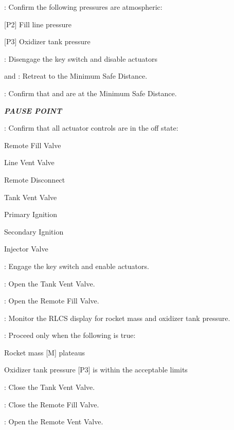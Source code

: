 \begin{checklist}
    \item \control{}: Confirm the following pressures are atmospheric:
    \begin{checklist}
        \item {[P2]} Fill line pressure
        \item {[P3]} Oxidizer tank pressure
    \end{checklist}
    \item \control{}: Disengage the key switch and disable actuators
    \item \primary{} and \secondary{}: Retreat to the Minimum Safe Distance.
    \item \secondary{}: Confirm that \primary{} and \secondary{} are at the Minimum Safe Distance.
    \item \textbf{\textit{PAUSE POINT}}
    \item \control: Confirm that all actuator controls are in the off state:
    \begin{checklist}
        \item Remote Fill Valve
        \item Line Vent Valve
        \item Remote Disconnect
        \item Tank Vent Valve
        \item Primary Ignition
        \item Secondary Ignition
        \item Injector Valve
    \end{checklist}
    \item \control{}: Engage the key switch and enable actuators.
    \item \control{}: Open the Tank Vent Valve.
    \item \control{}: Open the Remote Fill Valve.
    \item \control{}: Monitor the RLCS display for rocket mass and oxidizer tank pressure.
    \item \ops{}: Proceed only when the following is true:
    \begin{checklist}
        \item Rocket mass [M] plateaus
        \item Oxidizer tank pressure [P3] is within the acceptable limits
    \end{checklist}
    \item \control{}: Close the Tank Vent Valve.
    \item \control{}: Close the Remote Fill Valve.
    \item \control{}: Open the Remote Vent Valve.

\end{checklist}
